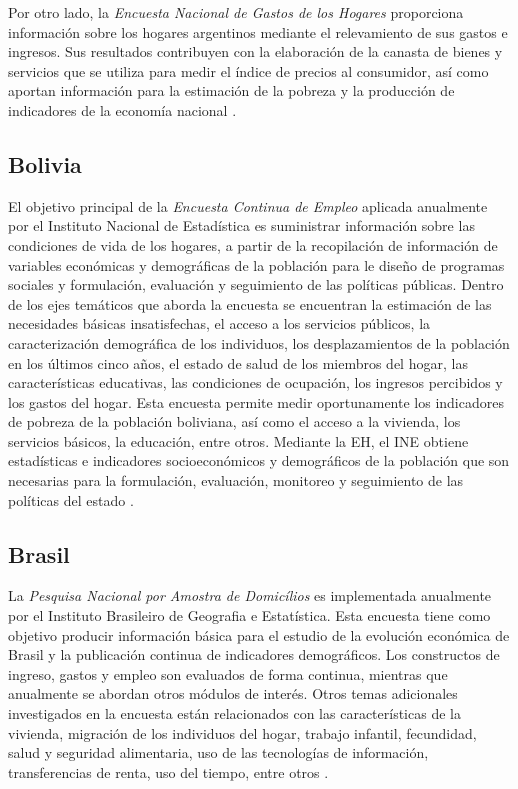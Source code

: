 \documentclass[
  12pt,
]{book}
\begin{document}
Por otro lado, la \emph{Encuesta Nacional de Gastos de los Hogares} proporciona información sobre los hogares argentinos mediante el relevamiento de sus gastos e ingresos. Sus resultados contribuyen con la elaboración de la canasta de bienes y servicios que se utiliza para medir el índice de precios al consumidor, así como aportan información para la estimación de la pobreza y la producción de indicadores de la economía nacional \citep{INDEC-AR2}.

\hypertarget{bolivia}{%
\subsection{Bolivia}\label{bolivia}}

El objetivo principal de la \emph{Encuesta Continua de Empleo} aplicada anualmente por el Instituto Nacional de Estadística es suministrar información sobre las condiciones de vida de los hogares, a partir de la recopilación de información de variables económicas y demográficas de la población para le diseño de programas sociales y formulación, evaluación y seguimiento de las políticas públicas. Dentro de los ejes temáticos que aborda la encuesta se encuentran la estimación de las necesidades básicas insatisfechas, el acceso a los servicios públicos, la caracterización demográfica de los individuos, los desplazamientos de la población en los últimos cinco años, el estado de salud de los miembros del hogar, las características educativas, las condiciones de ocupación, los ingresos percibidos y los gastos del hogar. Esta encuesta permite medir oportunamente los indicadores de pobreza de la población boliviana, así como el acceso a la vivienda, los servicios básicos, la educación, entre otros. Mediante la EH, el INE obtiene estadísticas e indicadores socioeconómicos y demográficos de la población que son necesarias para la formulación, evaluación, monitoreo y seguimiento de las políticas del estado \citep{INE-BO}.

\hypertarget{brasil}{%
\subsection{Brasil}\label{brasil}}

La \emph{Pesquisa Nacional por Amostra de Domicílios} es implementada anualmente por el Instituto Brasileiro de Geografia e Estatística. Esta encuesta tiene como objetivo producir información básica para el estudio de la evolución económica de Brasil y la publicación continua de indicadores demográficos. Los constructos de ingreso, gastos y empleo son evaluados de forma continua, mientras que anualmente se abordan otros módulos de interés. Otros temas adicionales investigados en la encuesta están relacionados con las características de la vivienda, migración de los individuos del hogar, trabajo infantil, fecundidad, salud y seguridad alimentaria, uso de las tecnologías de información, transferencias de renta, uso del tiempo, entre otros \citep{IBGEBR_2017}.
\end{document}
